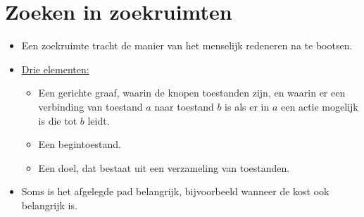 \chapter{Zoeken in zoekruimten}
\begin{itemize}
	\item Een zoekruimte tracht de manier van het menselijk redeneren na te bootsen.
	\item \underline{Drie elementen:}
	\begin{itemize}
		\item Een gerichte graaf, waarin de knopen toestanden zijn, en waarin er een verbinding van toestand $a$ naar toestand $b$ is als er in $a$ een actie mogelijk is die tot $b$ leidt.
		\item Een begintoestand.
		\item Een doel, dat bestaat uit een verzameling van toestanden.
	\end{itemize}
	\item Soms is het afgelegde pad belangrijk, bijvoorbeeld wanneer de kost ook belangrijk is.
\end{itemize}
